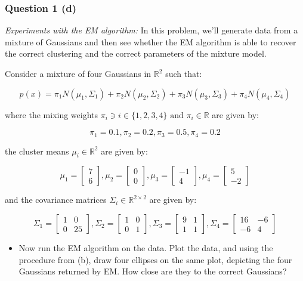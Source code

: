 \documentclass{article}
\begin{document}
\subsubsection*{Question 1 (d)}
\begin{flushleft}
\textit{Experiments with the EM algorithm:} In this problem, we'll generate data from a mixture of Gaussians and then see whether the EM algorithm is able to recover the correct clustering and the correct parameters of the mixture model.
\end{flushleft}
\begin{flushleft}
    Consider a mixture of four Gaussians in $\mathbb{R}^2$ such that:
\end{flushleft}
$$p(x) = \pi_1 N(\mu_1, \Sigma_1) + \pi_2 N(\mu_2, \Sigma_2) + \pi_3 N(\mu_3, \Sigma_3) + \pi_4 N(\mu_4, \Sigma_4)$$
\begin{flushleft}
    where the mixing weights $\pi_i \ni i \in \{1,2,3,4\} \text{ and } \pi_i \in \mathbb{R}$ are given by:
\end{flushleft}
$$\pi_1 = 0.1, \pi_2 = 0.2, \pi_3 = 0.5, \pi_4 = 0.2$$
\begin{flushleft}
    the cluster means $\mu_i \in \mathbb{R}^2$ are given by:
\end{flushleft}
$$\mu_1 = \begin{bmatrix}7 \\ 6\end{bmatrix}, \mu_2 = \begin{bmatrix}0 \\ 0\end{bmatrix}, \mu_3 = \begin{bmatrix}-1 \\ 4\end{bmatrix}, \mu_4 = \begin{bmatrix}5 \\ -2\end{bmatrix}$$
\begin{flushleft}
    and the covariance matrices $\Sigma_i \in \mathbb{R}^{2 \times 2}$ are given by:
\end{flushleft}
$$\Sigma_1 = \begin{bmatrix}1 & 0 \\ 0 & 25\end{bmatrix}, \Sigma_2 = \begin{bmatrix}1 & 0 \\ 0 & 1\end{bmatrix}, \Sigma_3 = \begin{bmatrix}9 & 1 \\ 1 & 1\end{bmatrix}, \Sigma_4 = \begin{bmatrix}16 & -6 \\ -6 & 4\end{bmatrix}$$
\begin{itemize}
    \item Now run the EM algorithm on the data. Plot the data, and using the procedure from (b), draw four ellipses on the same plot, depicting the four Gaussians returned by EM. How close are they to the correct Gaussians?
\end{itemize}
\end{document}
